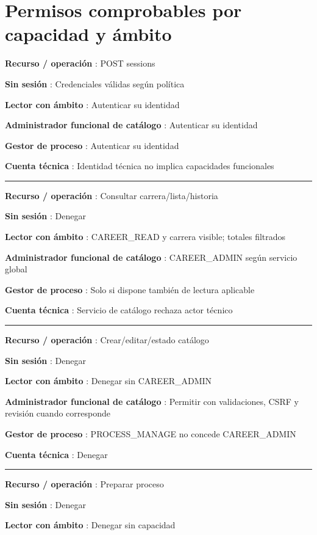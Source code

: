\documentclass[12pt,a4paper]{report}
\begin{document}
\section{Permisos comprobables por capacidad y
ámbito}\label{ACD4-semana-4-anexo0-permisos-comprobables-por-capacidad-y-uxe1mbito}

\textbf{Recurso / operación }: POST sessions

\textbf{Sin sesión }: Credenciales válidas según política

\textbf{Lector con ámbito }: Autenticar su identidad

\textbf{Administrador funcional de catálogo }: Autenticar su identidad

\textbf{Gestor de proceso }: Autenticar su identidad

\textbf{Cuenta técnica }: Identidad técnica no implica capacidades
funcionales

\medskip\hrule\medskip

\textbf{Recurso / operación }: Consultar carrera/lista/historia

\textbf{Sin sesión }: Denegar

\textbf{Lector con ámbito }: CAREER\_READ y carrera visible; totales
filtrados

\textbf{Administrador funcional de catálogo }: CAREER\_ADMIN según
servicio global

\textbf{Gestor de proceso }: Solo si dispone también de lectura
aplicable

\textbf{Cuenta técnica }: Servicio de catálogo rechaza actor técnico

\medskip\hrule\medskip

\textbf{Recurso / operación }: Crear/editar/estado catálogo

\textbf{Sin sesión }: Denegar

\textbf{Lector con ámbito }: Denegar sin CAREER\_ADMIN

\textbf{Administrador funcional de catálogo }: Permitir con
validaciones, CSRF y revisión cuando corresponde

\textbf{Gestor de proceso }: PROCESS\_MANAGE no concede CAREER\_ADMIN

\textbf{Cuenta técnica }: Denegar

\medskip\hrule\medskip

\textbf{Recurso / operación }: Preparar proceso

\textbf{Sin sesión }: Denegar

\textbf{Lector con ámbito }: Denegar sin capacidad
\end{document}
